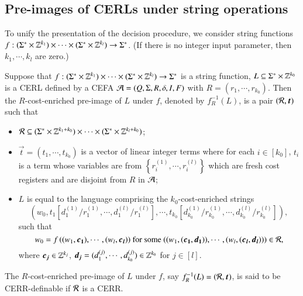  

\subsection{Pre-images of CERLs under string operations} \label{sect:pre}

To unify the presentation of the decision procedure, %
we consider string functions $f: (\Sigma^* \times \mathbb{Z}^{k_1}) \times \cdots \times (\Sigma^* \times \mathbb{Z}^{k_l}) \rightarrow \Sigma^*$. (If there is no integer input parameter, then $k_1,\cdots,k_l$ are zero.)  

\begin{definition} \label{def:preimage}
Suppose that $f: (\Sigma^* \times \mathbb{Z}^{k_1}) \times \cdots \times (\Sigma^* \times \mathbb{Z}^{k_l}) \rightarrow \Sigma^*$ is a string function, $L \subseteq \Sigma^* \times \mathbb{Z}^{k_0}$ is a CERL defined by a CEFA $\mathcal{A}=(Q, \Sigma, R, \delta, I, F)$ with $R= (r_1, \cdots, r_{k_0})$. Then the $R$-cost-enriched pre-image of $L$ under $f$, denoted by $f^{-1}_R(L)$, is a pair $(\cR, \vec{t})$ such that 
\begin{itemize}
\item $\mathcal{R} \subseteq (\Sigma^* \times \mathbb{Z}^{k_1 + k_0}) \times \cdots \times (\Sigma^* \times \mathbb{Z}^{k_l + k_0})$;
\item $\vec{t} = (t_1, \cdots ,t_{k_0})$ is a vector of linear integer terms where for each $i \in [k_0]$, $t_i$ is a term whose variables are from $\left\{r^{(1)}_i, \cdots, r^{(l)}_i\right\}$ which are fresh cost registers and are disjoint from $R$ in $\mathcal{A}$;

\item $L$ is equal to the language comprising the $k_0$-cost-enriched strings
%
\[\left(w_0, t_1\left[d^{(1)}_{1}/r^{(1)}_1, \cdots, d^{(l)}_{1}/r^{(l)}_1\right], \cdots, t_{k_0}\left[d^{(1)}_{k_0}/r^{(1)}_{k_0}, \cdots, d^{(l)}_{k_0}/r^{(l)}_{k_0}\right]
\right), \]
%
such that 
\[w_0 = f\left((w_1, \vec{c_1}), \cdots, (w_l, \vec{c_l}\right)) \mbox{ for some } ((w_1, (\vec{c_1}, \vec{d_1})), \cdots, (w_l, (\vec{c_l}, \vec{d_l}))) \in \cR,\]
where $\vec{c_j} \in \Int^{k_j}$, $\vec{d_j} = (d^{(j)}_{1}, \cdots, d^{(j)}_{k_0}) \in \Int^{k_0}$ for $j\in [l]$.
%
\end{itemize}
The $R$-cost-enriched pre-image of $L$ under $f$, say $f^{-1}_R(L)=(\cR, \vec{t})$, is said to be CERR-definable if $\mathcal{R}$ is a CERR. 
\end{definition}

